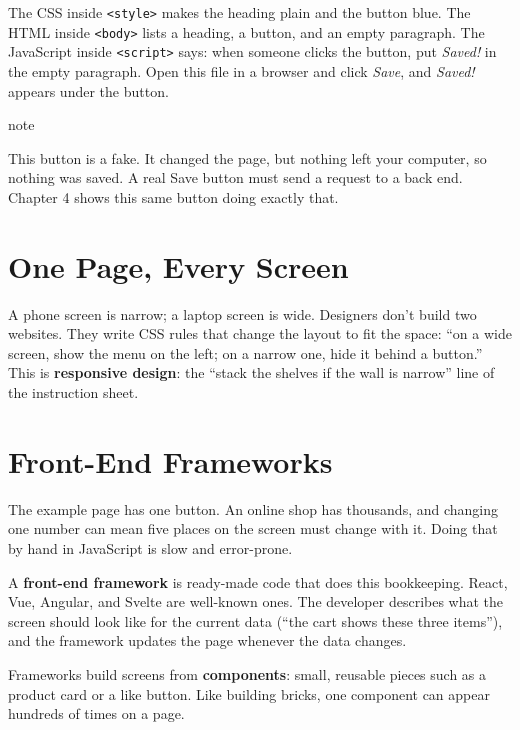 The CSS inside \texttt{\textless{}style\textgreater{}} makes the heading plain and the button blue. The HTML inside \texttt{\textless{}body\textgreater{}} lists a heading, a button, and an empty paragraph. The JavaScript inside \texttt{\textless{}script\textgreater{}} says: when someone clicks the button, put \emph{Saved!} in the empty paragraph. Open this file in a browser and click \emph{Save}, and \emph{Saved!} appears under the button.

\begin{callout}{note}

This button is a fake. It changed the page, but nothing left your computer, so nothing was saved. A real Save button must send a request to a back end. Chapter 4 shows this same button doing exactly that.

\end{callout}

\section{One Page, Every Screen}\label{02-the-front-end:one-page-every-screen}

A phone screen is narrow; a laptop screen is wide. Designers don't build two websites. They write CSS rules that change the layout to fit the space: ``on a wide screen, show the menu on the left; on a narrow one, hide it behind a button.'' This is \textbf{responsive design}: the ``stack the shelves if the wall is narrow'' line of the instruction sheet.

\section{Front-End Frameworks}\label{02-the-front-end:front-end-frameworks}

The example page has one button. An online shop has thousands, and changing one number can mean five places on the screen must change with it. Doing that by hand in JavaScript is slow and error-prone.

A \textbf{front-end framework} is ready-made code that does this bookkeeping. React, Vue, Angular, and Svelte are well-known ones. The developer describes what the screen should look like for the current data (``the cart shows these three items''), and the framework updates the page whenever the data changes.

Frameworks build screens from \textbf{components}: small, reusable pieces such as a product card or a like button. Like building bricks, one component can appear hundreds of times on a page.

